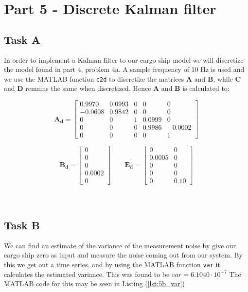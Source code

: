 \section{Part 5 - Discrete Kalman filter}

\subsection{Task A}
In order to implement a Kalman filter to our cargo ship model we will discretize the model found in part 4, problem 4a. A sample frequency of 10 Hz is used and we use the MATLAB function \texttt{c2d} to discretize the matrices \textbf{A} and \textbf{B}, while \textbf{C} and \textbf{D} remains the same when discretized. 
Hence \textbf{A} and \textbf{B} is calculated to:

\begin{equation}
    \bm{A_d} = 
    \begin{bmatrix}
        0.9970 & 0.0993 & 0 & 0 & 0 \\
        -0.0608 & 0.9842 & 0 & 0 & 0 \\
        0 & 0 & 1 & 0.0999 & 0 \\
        0 & 0 & 0 & 0.9986 & -0.0002 \\     \nonumber
        0 & 0 & 0 & 0 & 1
    \end{bmatrix}
\end{equation}

\begin{equation}
    \bm{B_d} = 
    \begin{bmatrix}
       0 \\ 0 \\ 0 \\ 0.0002 \\ 0
    \end{bmatrix} \qquad \bm{E_d} = 
    \begin{bmatrix}
       0 & 0 \\ 0.0005 & 0 \\ 0 & 0 \\ 0 & 0 \\ 0 & 0.10 \nonumber
    \end{bmatrix}
\end{equation}\\ \\

\subsection{Task B}
We can find an estimate of the variance of the measurement noise by give our cargo ship zero as input and measure the noise coming out from our system. By this we get out a time series, and by using the MATLAB function \texttt{var} it calculates the estimated variance. This was found to be $var = 6.1040 \cdot 10^{-7}$
The MATLAB code for this may be seen in Listing (\ref{lst:5b_var})

